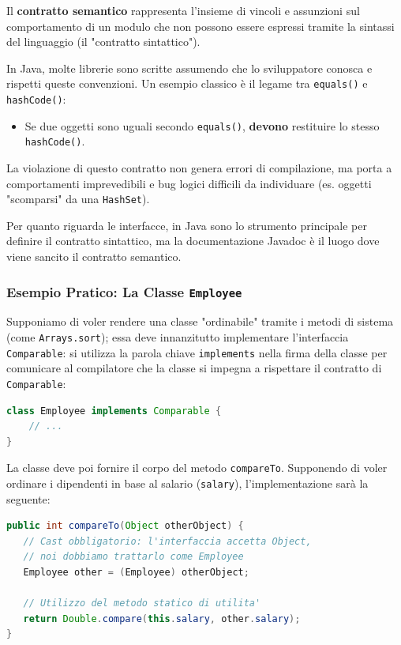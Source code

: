 \begin{tip}
Il \textbf{contratto semantico} rappresenta l'insieme di vincoli e assunzioni sul comportamento di un modulo che non possono essere espressi tramite la sintassi del linguaggio (il "contratto sintattico").

In Java, molte librerie sono scritte assumendo che lo sviluppatore conosca e rispetti queste convenzioni. Un esempio classico è il legame tra \texttt{equals()} e \texttt{hashCode()}:
\begin{itemize}
    \item Se due oggetti sono uguali secondo \texttt{equals()}, \textbf{devono} restituire lo stesso \texttt{hashCode()}.
\end{itemize}
La violazione di questo contratto non genera errori di compilazione, ma porta a comportamenti imprevedibili e bug logici difficili da individuare (es. oggetti "scomparsi" da una \texttt{HashSet}).

Per quanto riguarda le interfacce, in Java sono lo strumento principale per definire il contratto sintattico, ma la documentazione Javadoc è il luogo dove viene sancito il contratto semantico.
\end{tip}



\subsubsection*{Esempio Pratico: La Classe \texttt{Employee}}
Supponiamo di voler rendere una classe "ordinabile" tramite i metodi di sistema (come \texttt{Arrays.sort}); essa deve innanzitutto implementare l'interfaccia \texttt{Comparable}: si utilizza la parola chiave \texttt{implements} nella firma della classe per comunicare al compilatore che la classe si impegna a rispettare il contratto di \texttt{Comparable}:

\begin{lstlisting}[language=Java]
class Employee implements Comparable {
    // ...
}
\end{lstlisting}

La classe deve poi fornire il corpo del metodo \texttt{compareTo}. Supponendo di voler ordinare i dipendenti in base al salario (\texttt{salary}), l'implementazione sarà la seguente:

\begin{lstlisting}[language=Java]
public int compareTo(Object otherObject) {
   // Cast obbligatorio: l'interfaccia accetta Object, 
   // noi dobbiamo trattarlo come Employee
   Employee other = (Employee) otherObject;
   
   // Utilizzo del metodo statico di utilita'
   return Double.compare(this.salary, other.salary);
}
\end{lstlisting}

